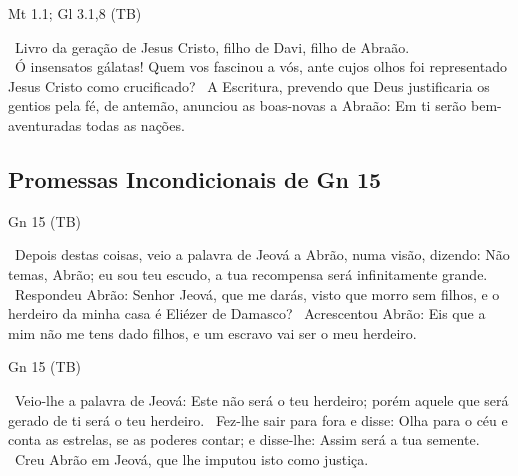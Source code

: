 \documentclass[12pt,aspectratio=169]{beamer}
\newcommand{\ver}[1]{%
    \raisebox{0.50ex}{%
        \scalebox{1.1}{%
            \pmb{\textbf{\textcolor{BSpbg}{#1}}}%
        }%
    }%
}
\newcommand{\QUOTE}[1]{%
    \par\noindent\hspace*{0.05\linewidth}%
    \begin{minipage}{0.9\linewidth}%
        \linespread{1.35}\large{#1}%
    \end{minipage}%
}
\newcommand{\YEL}[1]{{\textcolor{TXyel}{#1}}}
\newcommand{\GRE}[1]{{\textcolor{TXgre}{#1}}}
\newcommand{\CYA}[1]{{\textcolor{TXcya}{#1}}}
\newcommand{\MAG}[1]{{\textcolor{TXmag}{#1}}}
\newcommand{\BRI}[1]{{\textcolor{BSpbg}{#1}}}   %
\begin{document}
    \begin{frame}{Mt 1.1; Gl 3.1,8 (TB)}
        \QUOTE{%
            \ver{Mt 1.1}~Livro da geração de \MAG{Jesus Cristo}, filho de Davi, \YEL{filho de
            Abraão}.
            \\[\medskipamount]
            \ver{Gl 3.1}~Ó insensatos gálatas! Quem vos fascinou a vós, ante cujos olhos foi
            representado \MAG{Jesus Cristo} como crucificado?
            \ver{Gl 3.8}~A \YEL{Escritura}, \YEL{prevendo} que Deus justificaria os gentios pela
            fé, \YEL{de antemão, anunciou} as boas-novas a Abraão: \MAG{Em ti serão
            bem-aventuradas todas as nações}.
        }
    \end{frame}

    \subsection{Promessas \BRI{Incondicionais} de Gn 15}

    \begin{frame}{Gn 15 (TB)}
        \QUOTE{%
            \ver{1}~Depois destas coisas, veio a palavra de Jeová a Abrão, numa visão, dizendo:
            Não temas, Abrão; eu sou teu \YEL{escudo}, a tua \YEL{recompensa} será infinitamente
            grande.
            \ver{2}~Respondeu Abrão: Senhor Jeová, que me darás, visto que morro sem filhos, e o
            herdeiro da minha casa é Eliézer de Damasco?
            \ver{3}~Acrescentou Abrão: Eis que a mim não me tens dado filhos, e um escravo vai
            ser o meu herdeiro.
        }
    \end{frame}

    \begin{frame}{Gn 15 (TB)}
        \QUOTE{%
            \ver{4}~Veio-lhe a palavra de Jeová: Este não será o teu herdeiro; porém aquele que
            será \YEL{gerado de ti} será o teu herdeiro.
            \ver{5}~Fez-lhe sair para fora e disse: Olha para o céu e \CYA{conta as estrelas},
            se as poderes contar; e disse-lhe: \YEL{Assim será a tua semente}.
            \ver{6}~\GRE{Creu} Abrão em Jeová, que \GRE{lhe imputou isto como justiça}.
        }
    \end{frame}
\end{document}
